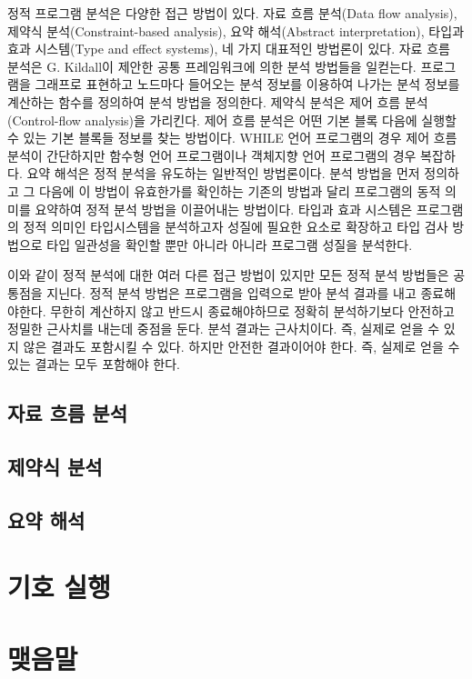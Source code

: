 \documentclass[a4paper]{book}
\begin{document}
정적 프로그램 분석은 다양한 접근 방법이 있다. 자료 흐름 분석(Data flow
analysis), 제약식 분석(Constraint-based analysis), 요약 해석(Abstract
interpretation), 타입과 효과 시스템(Type and effect systems), 네 가지
대표적인 방법론이 있다.
%
자료 흐름 분석은 G. Kildall이 제안한 공통
프레임워크\cite{kildall1973}에 의한 분석 방법들을 일컫는다. 프로그램을
그래프로 표현하고 노드마다 들어오는 분석 정보를 이용하여 나가는 분석
정보를 계산하는 함수를 정의하여 분석 방법을 정의한다.
%
제약식 분석은 제어 흐름 분석(Control-flow analysis)을 가리킨다. 제어
흐름 분석은 어떤 기본 블록 다음에 실행할 수 있는 기본 블록들 정보를
찾는 방법이다. WHILE 언어 프로그램의 경우 제어 흐름 분석이 간단하지만
함수형 언어 프로그램이나 객체지향 언어 프로그램의 경우 복잡하다.
%
요약 해석은 정적 분석을 유도하는 일반적인 방법론이다. 분석 방법을 먼저
정의하고 그 다음에 이 방법이 유효한가를 확인하는 기존의 방법과 달리
프로그램의 동적 의미를 요약하여 정적 분석 방법을 이끌어내는 방법이다.
%
타입과 효과 시스템은 프로그램의 정적 의미인 타입시스템을 분석하고자
성질에 필요한 요소로 확장하고 타입 검사 방법으로 타입 일관성을 확인할
뿐만 아니라 아니라 프로그램 성질을 분석한다.

이와 같이 정적 분석에 대한 여러 다른 접근 방법이 있지만 모든 정적 분석
방법들은 공통점을 지닌다. 정적 분석 방법은 프로그램을 입력으로 받아
분석 결과를 내고 종료해야한다. 무한히 계산하지 않고 반드시
종료해야하므로 정확히 분석하기보다 안전하고 정밀한 근사치를 내는데
중점을 둔다. 분석 결과는 근사치이다. 즉, 실제로 얻을 수 있지 않은
결과도 포함시킬 수 있다. 하지만 안전한 결과이어야 한다. 즉, 실제로
얻을 수 있는 결과는 모두 포함해야 한다.

\section{자료 흐름 분석}

\section{제약식 분석}

\section{요약 해석}

\chapter{기호 실행}

\chapter{맺음말}




\end{document}
